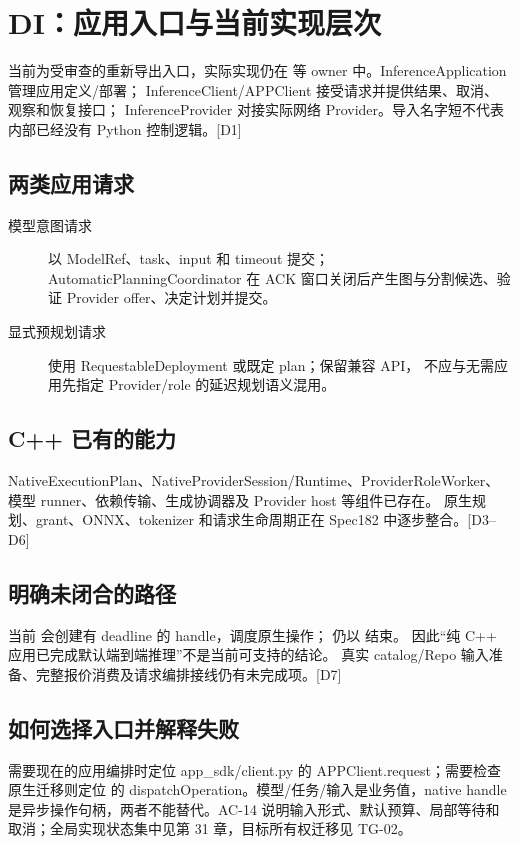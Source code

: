 \newpage

\section{DI：应用入口与当前实现层次}
 当前为受审查的重新导出入口，实际实现仍在
 等 owner 中。InferenceApplication 管理应用定义/部署；
InferenceClient/APPClient 接受请求并提供结果、取消、观察和恢复接口；
InferenceProvider 对接实际网络 Provider。导入名字短不代表内部已经没有 Python 控制逻辑。[D1]

\subsection{两类应用请求}
\begin{description}
\item[模型意图请求] 以 ModelRef、task、input 和 timeout 提交；AutomaticPlanningCoordinator
在 ACK 窗口关闭后产生图与分割候选、验证 Provider offer、决定计划并提交。
\item[显式预规划请求] 使用 RequestableDeployment 或既定 plan；保留兼容 API，
不应与无需应用先指定 Provider/role 的延迟规划语义混用。
\end{description}

\subsection{C++ 已有的能力}
NativeExecutionPlan、NativeProviderSession/Runtime、ProviderRoleWorker、
模型 runner、依赖传输、生成协调器及 Provider host 等组件已存在。
原生规划、grant、ONNX、tokenizer 和请求生命周期正在 Spec182 中逐步整合。[D3--D6]

\subsection{明确未闭合的路径}
当前  会创建有 deadline 的 handle，调度原生操作；
 仍以  结束。
因此“纯 C++ 应用已完成默认端到端推理”不是当前可支持的结论。
真实 catalog/Repo 输入准备、完整报价消费及请求编排接线仍有未完成项。[D7]



\subsection{如何选择入口并解释失败}
需要现在的应用编排时定位 app\_sdk/client.py 的 APPClient.request；需要检查原生迁移则定位  的 dispatchOperation。模型/任务/输入是业务值，native handle 是异步操作句柄，两者不能替代。AC-14 说明输入形式、默认预算、局部等待和取消；全局实现状态集中见第 31 章，目标所有权迁移见 TG-02。

